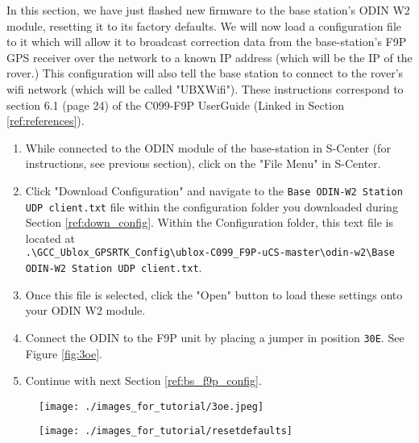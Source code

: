 \documentclass{article}%
\begin{document}
	In this section, we have just flashed new firmware to the base station's ODIN W2 module, resetting it to its factory defaults.  We will now load a configuration file to it which will allow it to broadcast correction data from the base-station's F9P GPS receiver over the network to a known IP address (which will be the IP of the rover.)  This configuration will also tell the base station to connect to the rover's wifi network (which will be called "UBXWifi").  These instructions correspond to section 6.1 (page 24) of the C099-F9P UserGuide (Linked in Section \ref{ref:references}).
	\begin{enumerate}
	\item While connected to the ODIN module of the base-station in S-Center (for instructions, see previous section), click on the "File Menu" in S-Center.
	\item Click "Download Configuration" and navigate to the \texttt{Base ODIN-W2 Station UDP client.txt} file within the configuration folder you downloaded during Section \ref{ref:down_config}.  Within the Configuration folder, this text file is located at\\ \texttt{.\textbackslash GCC\_Ublox\_GPSRTK\_Config\textbackslash ublox-C099\_F9P-uCS-master\textbackslash odin-w2\textbackslash Base ODIN-W2 Station UDP client.txt}.
	\item Once this file is selected, click the "Open" button to load these settings onto your ODIN W2 module.
	\item Connect the ODIN to the F9P unit by placing a jumper in position \texttt{30E}. See Figure \ref{fig:3oe}.
	\item Continue with next Section \ref{ref:bs_f9p_config}.
	\end{enumerate}
	
	\begin{figure}
	\centering
	\begin{minipage}{.5\textwidth}
	  \centering
	  \texttt{[image: ./images\_for\_tutorial/3oe.jpeg]}
	  \label{fig:3oe}
	\end{minipage}%
	\begin{minipage}{.5\textwidth}
	  \centering
	  \texttt{[image: ./images\_for\_tutorial/resetdefaults]}
	  \label{fig:resetdefaults}
	\end{minipage}
	\end{figure}
	
\end{document}
